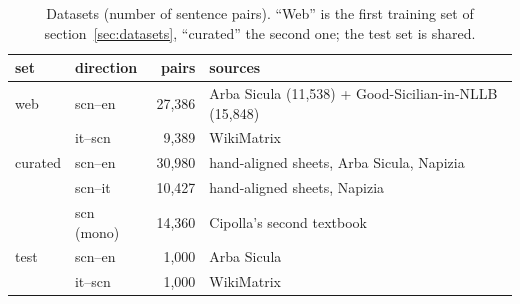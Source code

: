 \begin{table}[t]
\caption{Datasets (number of sentence pairs). ``Web'' is the first training set of
section~\ref{sec:datasets}, ``curated'' the second one; the test set is shared.}
\label{tab:data}
\centering
\begin{tabular}{llrl}
\toprule
set & direction & pairs & sources \\
\midrule
web     & scn--en & 27{,}386 & Arba Sicula (11{,}538) + Good-Sicilian-in-NLLB (15{,}848) \\
        & it--scn & 9{,}389  & WikiMatrix \\
curated & scn--en & 30{,}980 & hand-aligned sheets, Arba Sicula, Napizia \\
        & scn--it & 10{,}427 & hand-aligned sheets, Napizia \\
        & scn (mono) & 14{,}360 & Cipolla's second textbook \\
test    & scn--en & 1{,}000 & Arba Sicula \\
        & it--scn & 1{,}000 & WikiMatrix \\
\bottomrule
\end{tabular}
\end{table}
